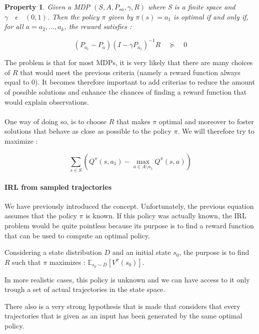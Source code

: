 \documentclass{article}
\newtheorem{property}{Property}
\begin{document}
\begin{property}
Given a MDP  $(S,A,P_{sa},\gamma,R)$ where S is a finite space and $\gamma \quad \epsilon \quad (0,1)$. Then the policy $\pi$ given by $ \pi(s)=a_{1}$ is optimal if and only if, for all $a=a_{2},...,a_{k}$, the reward satisfies :

\[
({ P }_{ a_{ 1 } }-{ P }_{ a }){ (I-\gamma { P }_{ { a }_{ 1 } }) }^{ -1 }R\quad \succeq \quad 0
\]
\end{property}



The problem is that for most MDPs, it is very likely that there are many choices of $R$ that would meet the previous criteria (namely a reward function always equal to 0). It becomes therefore important to add criterias to reduce the amount of possible solutions and enhance the chances of finding a reward function that would explain observations.

\paragraph{}
One way of doing so, is to choose $R$ that makes $\pi$ optimal and moreover to foster solutions that behave as close as possible to the policy $\pi$. We will therefore try to maximize :

\[
\sum _{s \in S}\left(Q^\pi(s, a_1) - \max_{a \in A \setminus a_1} Q^\pi(s,a)\right)
\]


\paragraph{IRL from sampled trajectories}

We have previously introduced the concept. Unfortunately, the previous equation assumes that the policy $\pi$ is known. If this policy was actually known, the IRL problem would be quite pointless because its purpose is to find a reward function that can be used to compute an optimal policy.

Considering a state distribution $D$ and an initial state $s_{0}$, the purpose is to find $R$ such that $\pi$ maximizes :
$\mathbb E_{ s_{ 0 }\sim D }\left[ { V }^{ \pi  }({ s }_{ 0 }) \right]$.

In more realistic cases, this policy is unknown and we can have access to it only trough a set of actual trajectories in the state space.

There also is a very strong hypothesis that is made that considers that every trajectories that is given as an input has been generated by the same optimal policy.
\end{document}
